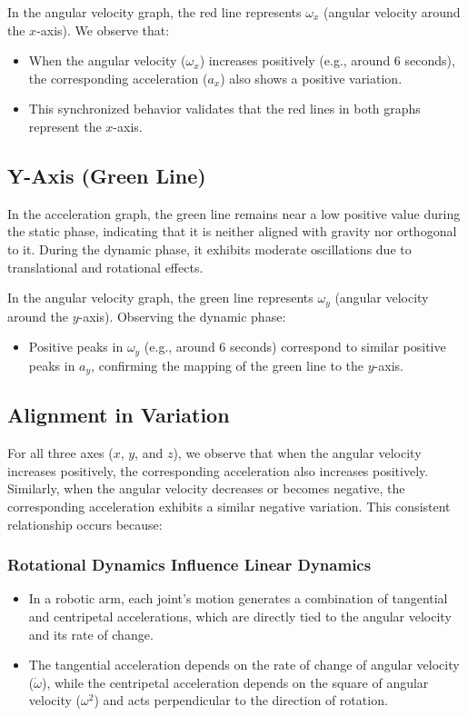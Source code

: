 \documentclass[12pt]{article}
\begin{document}
In the angular velocity graph, the red line represents \(\omega_x\) (angular velocity around the \(x\)-axis). We observe that:
\begin{itemize}
    \item When the angular velocity (\(\omega_x\)) increases positively (e.g., around 6 seconds), the corresponding acceleration (\(a_x\)) also shows a positive variation.
    \item This synchronized behavior validates that the red lines in both graphs represent the \(x\)-axis.
\end{itemize}

\subsection*{Y-Axis (Green Line)}

In the acceleration graph, the green line remains near a low positive value during the static phase, indicating that it is neither aligned with gravity nor orthogonal to it. During the dynamic phase, it exhibits moderate oscillations due to translational and rotational effects.

In the angular velocity graph, the green line represents \(\omega_y\) (angular velocity around the \(y\)-axis). Observing the dynamic phase:
\begin{itemize}
    \item Positive peaks in \(\omega_y\) (e.g., around 6 seconds) correspond to similar positive peaks in \(a_y\), confirming the mapping of the green line to the \(y\)-axis.
\end{itemize}

\subsection*{Alignment in Variation}

For all three axes (\(x\), \(y\), and \(z\)), we observe that when the angular velocity increases positively, the corresponding acceleration also increases positively. Similarly, when the angular velocity decreases or becomes negative, the corresponding acceleration exhibits a similar negative variation. This consistent relationship occurs because:

\subsubsection*{Rotational Dynamics Influence Linear Dynamics}
\begin{itemize}
    \item In a robotic arm, each joint's motion generates a combination of tangential and centripetal accelerations, which are directly tied to the angular velocity and its rate of change.
    \item The tangential acceleration depends on the rate of change of angular velocity (\(\dot{\omega}\)), while the centripetal acceleration depends on the square of angular velocity (\(\omega^2\)) and acts perpendicular to the direction of rotation.
\end{itemize}
\end{document}
